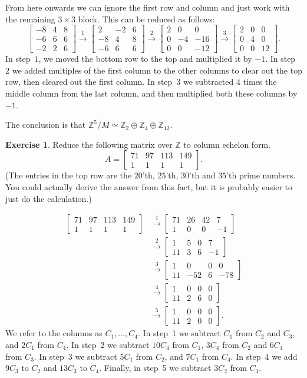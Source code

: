 \documentclass{amsart}
\newcommand{\bbm}       {\left[\begin{matrix}}
\newcommand{\ebm}       {\end{matrix}\right]}
\newcommand{\Z}         {{\mathbb{Z}}}
\newcommand{\tm}        {\times}
\newcommand{\xra}       {\xrightarrow}
\newcommand{\ip}[1]     {\langle #1\rangle}
\newcommand{\op}        {\oplus}
\renewcommand{\:}{\colon}
\theoremstyle{definition}
\newtheorem{exercise}{Exercise}[section]
\renewenvironment{solution}{\SolutionAtEnd}{\endSolutionAtEnd}
\begin{document}
\begin{solution}
 From here onwards we can ignore the first row and column and just
 work with the remaining $3\tm 3$ block.  This can be reduced as
 follows:
 \[ \bbm -8 & 4 & 8 \\ -6 & 6 & 6 \\ -2 & 2 & 6 \ebm \xra{1}
    \bbm 2 & -2 & 6 \\ -8 & 4 & 8 \\ -6 & 6 & 6 \ebm \xra{2}
    \bbm 2 & 0 & 0 \\ 0 & -4 & -16 \\ 0 & 0 & -12 \ebm \xra{3}
    \bbm 2 & 0 & 0 \\ 0 & 4 & 0 \\ 0 & 0 & 12 \ebm.
 \]
 In step~$1$, we moved the bottom row to the top and multiplied it by
 $-1$.  In step~$2$ we added multiples of the first column to the
 other columns to clear out the top row, then cleared out the first
 column.  In step~$3$ we subtracted $4$ times the middle column from
 the last column, and then multiplied both these columns by $-1$.

 The conclusion is that $\Z^5/M\simeq \Z_2\op\Z_4\op\Z_{12}$.
\end{solution}

\begin{exercise}
 Reduce the following matrix over $\Z$ to column echelon form.
 \[ A = \bbm 71 & 97 & 113 & 149 \\ 1 & 1 & 1 & 1 \ebm. \]
 (The entries in the top row are the $20$'th, $25$'th, $30$'th and
 $35$'th prime numbers.  You could actually derive the answer from
 this fact, but it is probably easier to just do the calculation.)
\end{exercise}
\begin{solution}
 \begin{align*}
  \bbm 71 & 97 & 113 & 149 \\ 1 & 1 & 1 & 1 \ebm 
   &\xra{1} \bbm 71 & 26 & 42 & 7 \\ 1 & 0 & 0 & -1 \ebm \\
   &\xra{2} \bbm 1 & 5 & 0 & 7 \\ 11 & 3 & 6 & -1 \ebm \\
   &\xra{3} \bbm 1 & 0 & 0 & 0 \\ 11 & -52 & 6 & -78 \ebm \\
   &\xra{4} \bbm 1 & 0 & 0 & 0 \\ 11 & 2 & 6 & 0 \ebm \\
   &\xra{5} \bbm 1 & 0 & 0 & 0 \\ 11 & 2 & 0 & 0 \ebm.
 \end{align*}
 We refer to the columns as $C_1,\ldots,C_4$.  In step~1 we subtract
 $C_1$ from $C_2$ and $C_3$, and $2C_1$ from $C_4$.  In step~2 we
 subtract $10C_4$ from $C_1$, $3C_4$ from $C_2$ and $6C_4$ from $C_3$.
 In step~3 we subtract $5C_1$ from $C_2$, and $7C_1$ from $C_4$.  In
 step~4 we add $9C_3$ to $C_2$ and $13C_3$ to $C_4$.  Finally, in
 step~5 we subtract $3C_2$ from $C_3$.
\end{solution}
\end{document}
